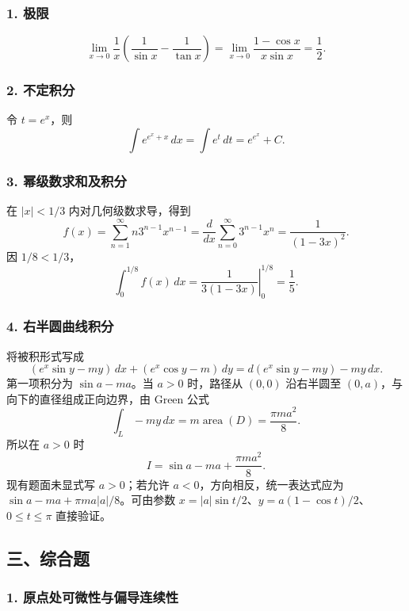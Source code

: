 \documentclass[11pt,fontset=fandol]{ctexart}
\begin{document}
\subsubsection{1. 极限}\label{ux6781ux9650-1}

\[
\boxed{\lim_{x\to0}\frac1x\left(\frac1{\sin x}-\frac1{\tan x}\right)
=\lim_{x\to0}\frac{1-\cos x}{x\sin x}=\frac12.}
\]

\subsubsection{2. 不定积分}\label{ux4e0dux5b9aux79efux5206}

令 \(t=e^x\)，则 \[
\boxed{\int e^{e^x+x}\,dx=\int e^t\,dt=e^{e^x}+C.}
\]

\subsubsection{3.
幂级数求和及积分}\label{ux5e42ux7ea7ux6570ux6c42ux548cux53caux79efux5206}

在 \(|x|<1/3\) 内对几何级数求导，得到 \[
f(x)=\sum_{n=1}^{\infty}n3^{n-1}x^{n-1}
=\frac{d}{dx}\sum_{n=0}^{\infty}3^{n-1}x^n
=\boxed{\frac1{(1-3x)^2}}.
\] 因 \(1/8<1/3\)， \[
\boxed{\int_0^{1/8}f(x)\,dx
=\left.\frac1{3(1-3x)}\right|_0^{1/8}=\frac15.}
\]

\subsubsection{4.
右半圆曲线积分}\label{ux53f3ux534aux5706ux66f2ux7ebfux79efux5206}

将被积形式写成 \[
(e^x\sin y-my)\,dx+(e^x\cos y-m)\,dy
=d(e^x\sin y-my)-my\,dx.
\] 第一项积分为 \(\sin a-ma\)。当 \(a>0\) 时，路径从 \((0,0)\)
沿右半圆至 \((0,a)\)，与向下的直径组成正向边界，由 Green 公式 \[
\int_L-my\,dx=m\operatorname{area}(D)=\frac{\pi ma^2}{8}.
\] 所以在 \(a>0\) 时 \[
\boxed{I=\sin a-ma+\frac{\pi ma^2}{8}.}
\] 现有题面未显式写 \(a>0\)；若允许 \(a<0\)，方向相反，统一表达式应为
\(\sin a-ma+\pi ma|a|/8\)。可由参数
\(x=|a|\sin t/2\)、\(y=a(1-\cos t)/2\)、\(0\leq t\leq\pi\) 直接验证。

\subsection{三、综合题}\label{ux4e09ux7efcux5408ux9898}

\subsubsection{1.
原点处可微性与偏导连续性}\label{ux539fux70b9ux5904ux53efux5faeux6027ux4e0eux504fux5bfcux8fdeux7eedux6027}
\end{document}
